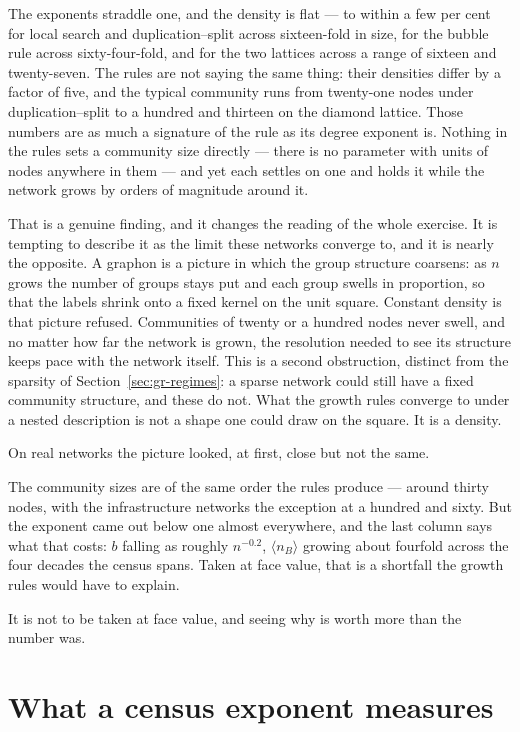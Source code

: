 The exponents straddle one, and the density is flat --- to within a few per cent
for local search and duplication--split across sixteen-fold in size, for the
bubble rule across sixty-four-fold, and for the two lattices across a range of
sixteen and twenty-seven. The rules are not saying the same thing: their
densities differ by a factor of five, and the typical community runs from
twenty-one nodes under duplication--split to a hundred and thirteen on the
diamond lattice. Those numbers are as much a signature of the rule as its degree
exponent is.
Nothing in the rules sets a community size directly --- there is no parameter with
units of nodes anywhere in them --- and yet each settles on one and holds it while
the network grows by orders of magnitude around it.

That is a genuine finding, and it changes the reading of the whole exercise. It is
tempting to describe it as the limit these networks converge to, and it is nearly
the opposite. A graphon is a picture in which the group structure coarsens: as
$n$ grows the number of groups stays put and each group swells in proportion, so
that the labels shrink onto a fixed kernel on the unit square. Constant density is
that picture refused. Communities of twenty or a hundred nodes never swell, and no
matter how far the network is grown, the resolution needed to see its structure
keeps pace with the network itself. This is a second obstruction, distinct from
the sparsity of Section~\ref{sec:gr-regimes}: a sparse network could still have a
fixed community structure, and these do not. What the growth rules converge to
under a nested description is not a shape one could draw on the square. It is a
density.

On real networks the picture looked, at first, close but not the same.



\noindent The community sizes are of the same order the rules produce --- around
thirty nodes, with the infrastructure networks the exception at a hundred and
sixty. But the exponent came out below one almost everywhere, and the last column
says what that costs: $b$ falling as roughly $n^{-0.2}$, $\langle n_B\rangle$ growing
about fourfold across the four decades the census spans. Taken at face value, that
is a shortfall the growth rules would have to explain.

It is not to be taken at face value, and seeing why is worth more than the number
was.

\section{What a census exponent measures}
\label{sec:gr-within}

